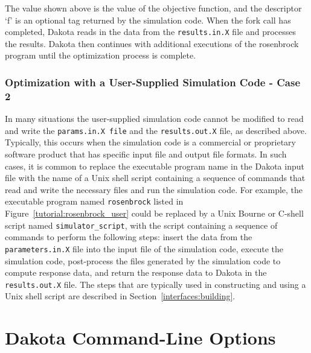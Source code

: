 The value shown above is the value of the objective function, and the
descriptor `f' is an optional tag returned by the simulation code.
When the fork call has completed, Dakota reads in the data from the
\texttt{results.in.X} file and processes the results. Dakota then
continues with additional executions of the rosenbrock program until
the optimization process is complete.

\subsubsection{Optimization with a User-Supplied Simulation Code - Case 2}\label{tutorial:examples:user_supply:optimization2}

In many situations the user-supplied simulation code cannot be
modified to read and write the \texttt{params.in.X file} and the
\texttt{results.out.X} file, as described above. Typically, this
occurs when the simulation code is a commercial or proprietary
software product that has specific input file and output file formats.
In such cases, it is common to replace the executable program name in
the Dakota input file with the name of a Unix shell script containing
a sequence of commands that read and write the necessary files and run
the simulation code. For example, the executable program named
\texttt{rosenbrock} listed in Figure~\ref{tutorial:rosenbrock_user}
could be replaced by a Unix Bourne or C-shell script named
\texttt{simulator\_script}, with the script containing a sequence of
commands to perform the following steps: insert the data from the
\texttt{parameters.in.X} file into the input file of the simulation
code, execute the simulation code, post-process the files generated by
the simulation code to compute response data, and return the response
data to Dakota in the \texttt{results.out.X} file. The steps that are
typically used in constructing and using a Unix shell script are
described in Section~\ref{interfaces:building}.

\section{Dakota Command-Line Options}\label{tutorial:installation:running}

